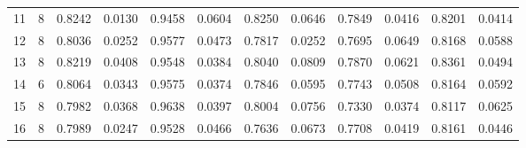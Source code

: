 \begin{tabular}{rrrrrrrrrrrr}
        11 &     8 &   0.8242 & 0.0130 &               0.9458 & 0.0604 &                   0.8250 & 0.0646 &               0.7849 & 0.0416 &                       0.8201 & 0.0414 \\
        12 &     8 &   0.8036 & 0.0252 &               0.9577 & 0.0473 &                   0.7817 & 0.0252 &               0.7695 & 0.0649 &                       0.8168 & 0.0588 \\
        13 &     8 &   0.8219 & 0.0408 &               0.9548 & 0.0384 &                   0.8040 & 0.0809 &               0.7870 & 0.0621 &                       0.8361 & 0.0494 \\
        14 &     6 &   0.8064 & 0.0343 &               0.9575 & 0.0374 &                   0.7846 & 0.0595 &               0.7743 & 0.0508 &                       0.8164 & 0.0592 \\
        15 &     8 &   0.7982 & 0.0368 &               0.9638 & 0.0397 &                   0.8004 & 0.0756 &               0.7330 & 0.0374 &                       0.8117 & 0.0625 \\
        16 &     8 &   0.7989 & 0.0247 &               0.9528 & 0.0466 &                   0.7636 & 0.0673 &               0.7708 & 0.0419 &                       0.8161 & 0.0446 \\
\bottomrule
\end{tabular}

